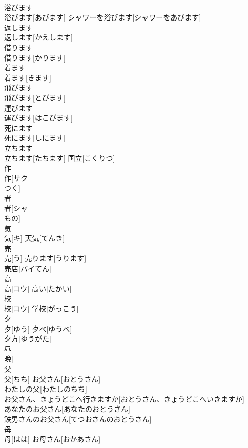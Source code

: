 \documentclass[8pt]{extreport}
\begin{document}
\begin{CJK}{UTF8}{min}
\\	浴びます	
\\	浴びます[あびます]	シャワーを浴びます[シャワーをあびます] 
\\	返します	
\\	返します[かえします]	
\\	借ります	
\\	借ります[かります]	
\\	着ます	
\\	着ます[きます]	
\\	飛びます	
\\	飛びます[とびます]	
\\	運びます	
\\	運びます[はこびます]	
\\	死にます	
\\	死にます[しにます]	
\\	立ちます	
\\	立ちます[たちます]	国立[こくりつ] 
\\	作	
\\	作[サク 
\\	つく]	
\\	者	
\\	者[シャ 
\\	もの]	
\\	気	
\\	気[キ]	天気[てんき] 
\\	売	
\\	売[う]	売ります[うります] 
\\	売店[バイてん] 
\\	高	
\\	高[コウ]	高い[たかい] 
\\	校	
\\	校[コウ]	学校[がっこう] 
\\	夕	
\\	夕[ゆう]	夕べ[ゆうべ] 
\\	夕方[ゆうがた] 
\\	昼 
\\	晩]
\\	父	
\\	父[ちち]	お父さん[おとうさん] 
\\	わたしの父[わたしのちち] 
\\	お父さん、きょうどこへ行きますか[おとうさん、きょうどこへいきますか] 
\\	あなたのお父さん[あなたのおとうさん] 
\\	鉄男さんのお父さん[てつおさんのおとうさん] 
\\	母	
\\	母[はは]	お母さん[おかあさん] 

\end{CJK}
\end{document}
